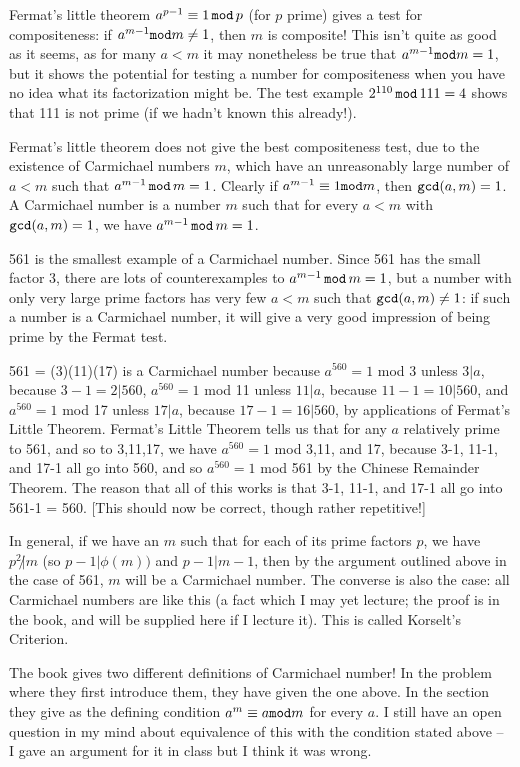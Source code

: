 \documentclass[12pt]{article}
\begin{document}
Fermat's little theorem $a^{p-1}\equiv 1\,{\tt mod}\,p$ (for $p$ prime) gives a test for compositeness:  if $a^{m-1}{\tt mod}m \neq 1$, then $m$ is composite!  This isn't quite as good as it seems, as for many $a<m$ it may nonetheless be
true that $a^{m-1}{\tt mod}m = 1$, but it shows the potential for testing a number for compositeness when you have no idea what its factorization might be.   The test example $2^{110}\,{\tt mod}\,111=4$ shows that 111 is not prime (if we hadn't known this already!).

Fermat's little theorem does not give the best compositeness test, due to the existence of Carmichael numbers  $m$, which have an unreasonably large number of $a<m$ such that $a^{m-1}\,{\tt mod}\,m=1$.   Clearly if $a^{m-1}\equiv 1{\tt mod}m$,
then ${\tt gcd}(a,m)=1$.   A Carmichael number is a number $m$ such that for every $a<m$ with ${\tt gcd}(a,m)=1$, we have $a^{m-1}\,{\tt mod}\,m=1$.

561 is the smallest example of a Carmichael number.   Since 561 has the small factor 3, there are lots of counterexamples to $a^{m-1}\,{\tt mod}\,m=1$, but a number with only very large prime factors has very few $a<m$ such that
${\tt gcd}(a,m) \neq 1$:  if such a number is a Carmichael number, it will give a very good impression of being prime by the Fermat test.

561 = (3)(11)(17) is a Carmichael number because $a^{560}=1$ mod 3 unless $3|a$, because $3-1=2|560$, $a^{560}=1$ mod 11 unless $11|a$, because $11-1=10|560$, and $a^{560}=1$ mod 17 unless $17|a$, because $17-1=16|560$,  by applications of Fermat's Little Theorem.  Fermat's Little Theorem tells us that for any $a$ relatively prime to 561, and so to 3,11,17,
we have $a^{560}=1$ mod 3,11, and 17, because 3-1, 11-1, and 17-1 all go into 560, and so $a^{560}=1$ mod 561 by the Chinese Remainder Theorem.   The reason that all of this works is that 3-1, 11-1, and 17-1 all go into 561-1 = 560.  [This should now be correct, though rather repetitive!]

In general, if we have an $m$ such that for each of its prime factors $p$, we have $p^2 \not| m$ (so $p-1|\phi(m))$ and $p-1 | m-1$, then by the argument outlined above in the case of 561, $m$ will be a Carmichael number.
The converse is also the case:  all Carmichael numbers are like this (a fact which I may yet lecture; the proof is in the book, and will be supplied here if I lecture it).  This is called Korselt's Criterion.

The book gives two different definitions of Carmichael number!   In the problem where they first introduce them, they have given the one above.   In the section they give as the defining condition $a^m \equiv a{\tt mod}m$ for
every $a$.   I still have an open question in my mind about equivalence of this with the condition stated above -- I gave an argument for it in class but I think it was wrong.
\end{document}
